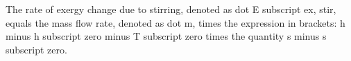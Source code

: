 The rate of exergy change due to stirring, denoted as dot E subscript ex, stir, equals the mass flow rate, denoted as dot m, times the expression in brackets: h minus h subscript zero minus T subscript zero times the quantity s minus s subscript zero.